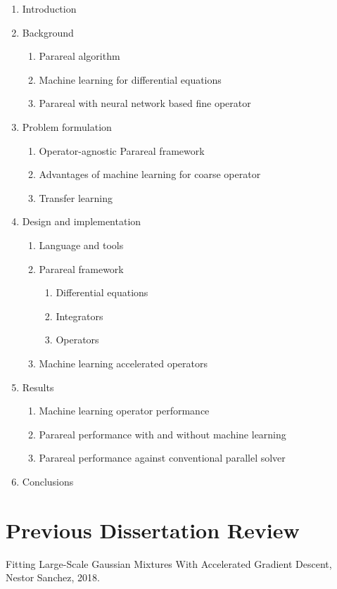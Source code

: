 \documentclass{article}
\begin{document}
\begin{enumerate}
	\item Introduction
	\item Background
    	\begin{enumerate}
    		\item Parareal algorithm
    		\item Machine learning for differential equations
    		\item Parareal with neural network based fine operator
    	\end{enumerate}
	\item Problem formulation
    	\begin{enumerate}
    		\item Operator-agnostic Parareal framework
    		\item Advantages of machine learning for coarse operator
    		\item Transfer learning
    	\end{enumerate}
	\item Design and implementation
    	\begin{enumerate}
    	    \item Language and tools
    		\item Parareal framework
            	\begin{enumerate}
            		\item Differential equations
            		\item Integrators
            		\item Operators
            	\end{enumerate}
    		\item Machine learning accelerated operators
    	\end{enumerate}
    \item Results
        \begin{enumerate}
    		\item Machine learning operator performance
    		\item Parareal performance with and without machine learning
    		\item Parareal performance against conventional parallel solver
    	\end{enumerate}
	\item Conclusions
\end{enumerate}

\section{Previous Dissertation Review}

Fitting Large-Scale Gaussian Mixtures With Accelerated Gradient Descent, Nestor Sanchez, 2018.

\pagebreak



\end{document}
